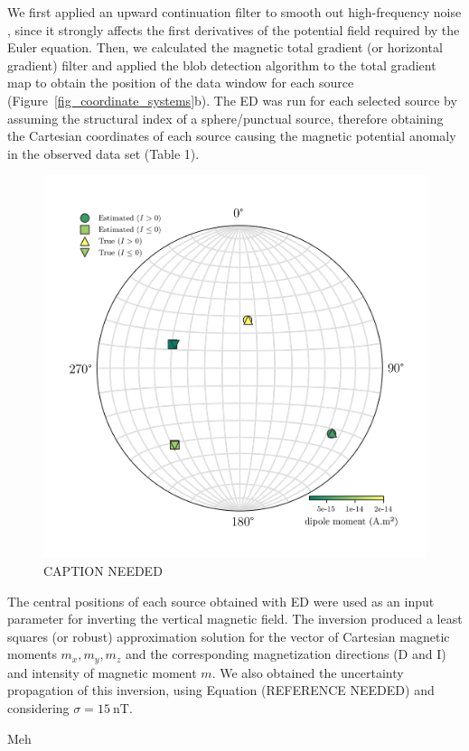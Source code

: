 We first applied an upward continuation filter to smooth out high-frequency
noise \citep{Blakely1996}, since it strongly affects the first derivatives of
the potential field required by the Euler equation. Then, we calculated the
magnetic total gradient (or horizontal gradient) filter and applied the blob
detection algorithm to the total gradient map to obtain the position of the
data window for each source (Figure~\ref{fig_coordinate_systems}b). The ED was
run for each selected source by assuming the structural index of a
sphere/punctual source, therefore obtaining the Cartesian coordinates of each
source causing the magnetic potential anomaly in the observed data set (Table
1).

\begin{figure}[tb]
\centering
\includegraphics[width=0.75\linewidth]{figures/simple-synthetic-dipole-moment.png}
\caption{
  CAPTION NEEDED
}
\label{fig_synthetic_simple_results}
\end{figure}

The central positions of each source obtained with ED were used as an input
parameter for inverting the vertical magnetic field. The inversion produced a
least squares (or robust) approximation solution for the vector of Cartesian
magnetic moments $m_x, m_y, m_z$ and the corresponding magnetization directions
(D and I) and intensity of magnetic moment $m$. We also obtained the
uncertainty propagation of this inversion, using Equation (REFERENCE NEEDED)
and considering $\sigma = \qty{15}{\nano\tesla}$.

\begin{table}[t]
  \begin{center}
    \small
    
  \end{center}
  \caption{Meh}
  \label{tab_synthetic_simple_results}
\end{table}

